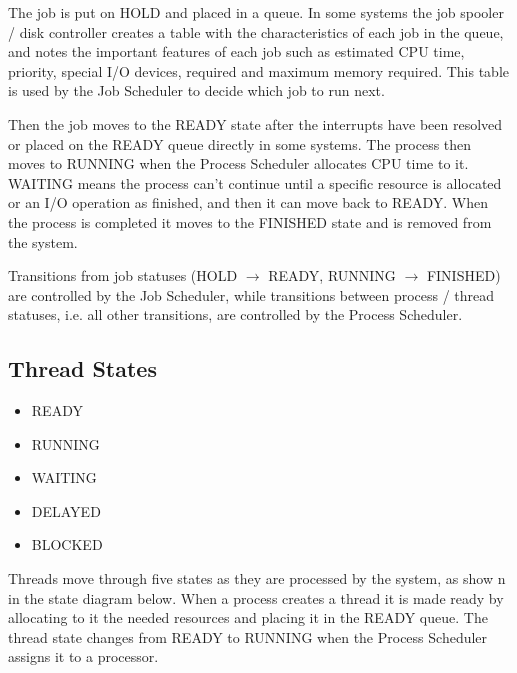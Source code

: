\documentclass[12pt letter]{report}
\begin{document}
The job is put on HOLD and placed in a queue. In some systems the job
spooler / disk controller creates a table with the characteristics of
each job in the queue, and notes the important features of each job
such as estimated CPU time, priority, special I/O devices, required
and maximum memory required. This table is used by the Job Scheduler
to decide which job to run next.

Then the job moves to the READY state after the interrupts have been
resolved or placed on the READY queue directly in some systems. The
process then moves to RUNNING when the Process Scheduler allocates
CPU time to it. WAITING means the process can't continue until a
specific resource is allocated or an I/O operation as finished, and
then it can move back to READY. When the process is completed it
moves to the FINISHED state and is removed from the system.

Transitions from job statuses (HOLD $\to $ READY, RUNNING $\to $
FINISHED) are controlled by the Job Scheduler, while transitions
between process / thread statuses, i.e. all other transitions, are
controlled by the Process Scheduler.

\subsection{Thread States}
\begin{itemize}
  \item READY
  \item RUNNING
  \item WAITING
  \item DELAYED
  \item BLOCKED
\end{itemize}

Threads move through five states as they are processed by the system,
as show n in the state diagram below. When a process creates a thread
it is made ready by allocating to it the needed resources and placing
it in the READY queue. The thread state changes from READY to RUNNING
when the Process Scheduler assigns it to a processor.
\end{document}
